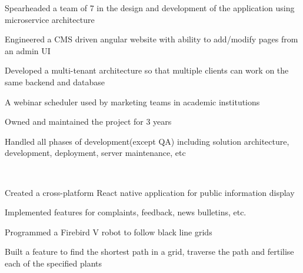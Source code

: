 \documentclass[]{deedy-resume-openfont}
\begin{document}
\begin{minipage}[t]{0.66\textwidth}
\begin{tightemize}
    \item Spearheaded a team of 7 in the design and development of the application using microservice architecture
    \item Engineered a CMS driven angular website with ability to add/modify pages from an admin UI
    \item Developed a multi-tenant architecture so that multiple clients can work on the same backend and database
\end{tightemize}
\sectionsep

\begin{tightemize}
    \item A webinar scheduler used by marketing teams in academic institutions
    \item Owned and maintained the project for 3 years
    \item Handled all phases of development(except QA) including solution architecture, development, deployment, server maintenance, etc
\end{tightemize}
\sectionsep

\\
\begin{tightemize}
    \item Created a cross-platform React native application for public information display
    \item Implemented features for complaints, feedback, news bulletins, etc.
\end{tightemize}
\sectionsep

\begin{tightemize}
    \item Programmed a Firebird V robot to follow black line grids
    \item Built a feature to find the shortest path in a grid, traverse the path and fertilise each of the specified plants
\end{tightemize}
\sectionsep



\end{minipage}
\end{document}
